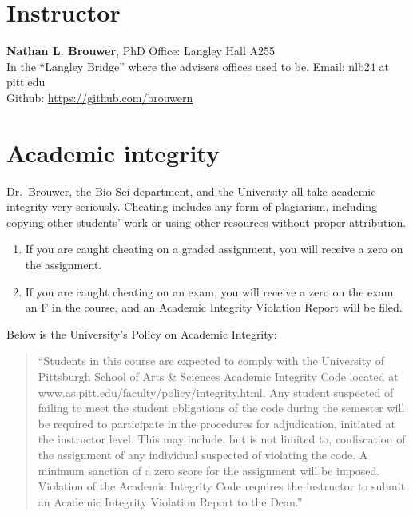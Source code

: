 \documentclass[
]{book}
\providecommand{\tightlist}{%
  \setlength{\itemsep}{0pt}\setlength{\parskip}{0pt}}
\begin{document}
\hypertarget{nlb}{%
\chapter{Instructor}\label{nlb}}

\textbf{Nathan L. Brouwer}, PhD
Office: Langley Hall A255\\
In the ``Langley Bridge'' where the advisers offices used to be.
Email: nlb24 at pitt.edu\\
Github: \url{https://github.com/brouwern}

\hypertarget{academic-integrity}{%
\chapter{Academic integrity}\label{academic-integrity}}

Dr.~Brouwer, the Bio Sci department, and the University all take academic integrity very seriously. Cheating includes any form of plagiarism, including copying other students' work or using other resources without proper attribution.

\begin{enumerate}
\def\labelenumi{\arabic{enumi}.}
\tightlist
\item
  If you are caught cheating on a graded assignment, you will receive a zero on the assignment.
\item
  If you are caught cheating on an exam, you will receive a zero on the exam, an F in the course, and an Academic Integrity Violation Report will be filed.
\end{enumerate}

Below is the University's Policy on Academic Integrity:

\begin{quote}
``Students in this course are expected to comply with the University of Pittsburgh School of Arts \& Sciences Academic Integrity Code located at www.as.pitt.edu/faculty/policy/integrity.html. Any student suspected of failing to meet the student obligations of the code during the semester will be required to participate in the procedures for adjudication, initiated at the instructor level. This may include, but is not limited to, confiscation of the assignment of any individual suspected of violating the code. A minimum sanction of a zero score for the assignment will be imposed. Violation of the Academic Integrity Code requires the instructor to submit an Academic Integrity Violation Report to the Dean.''
\end{quote}
\end{document}
